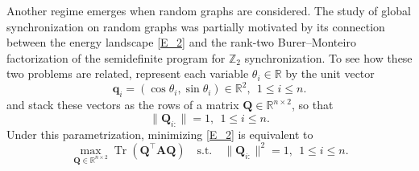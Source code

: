 \documentclass[11pt,reqno]{amsart}
\theoremstyle{definition}
\begin{document}
\noindent
Another regime emerges when random graphs are considered.
The study of global synchronization on random graphs was partially motivated by its connection between the energy landscape \eqref{E_2} and the rank-two Burer--Monteiro factorization of the semidefinite program for $\mathbb Z_2$ synchronization. To see how these two problems are related, represent each variable $\theta_i\in\mathbb R$ by the unit vector
\[
\mathbf q_i=(\cos\theta_i,\sin\theta_i)\in\mathbb R^2,
\ \ 1\le i\le n.
\]
and stack these vectors as the rows of a matrix $\mathbf Q\in\mathbb R^{n\times 2}$, so that
\[
\|\mathbf Q_{i:}\|=1,
\ \ 1\le i\le n.
\]
Under this parametrization, minimizing \eqref{E_2} is equivalent to 
\begin{equation}\label{rank-two-bm}
\max_{\mathbf Q\in\mathbb{R}^{n\times 2}}
\operatorname{Tr}(\mathbf Q^\top \mathbf A \mathbf Q)
\quad
\text{s.t.}\quad
\|\mathbf Q_{i:}\|^2=1,\ \ 1\le i\le n.
\end{equation}
\end{document}
